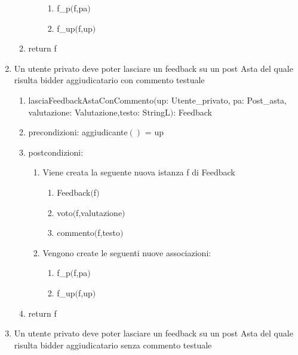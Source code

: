 \documentclass{article}
\begin{document}
\begin{enumerate}
\begin{enumerate}
\begin{enumerate}
            \begin{enumerate}
                \item f\_p$($f,pa$)$
                \item f\_up$($f,up$)$
            \end{enumerate}
        \end{enumerate}
        \item return f
    \end{enumerate}
    \newpage
    \item\label{sec:lasciaFeedbackAstaConCommento} Un utente privato deve poter lasciare un feedback su un post Asta del quale risulta bidder aggiudicatario con commento testuale
    \begin{enumerate}
        \item lasciaFeedbackAstaConCommento$($up: Utente\_privato, pa: Post\_asta, valutazione: Valutazione,\newline testo: StringL$)$: Feedback
        \item precondizioni: aggiudicante$()$ = up
        \item postcondizioni:
        \begin{enumerate}
            \item Viene creata la seguente nuova istanza f di Feedback
            \begin{enumerate}
                \item Feedback$($f$)$
                \item voto$($f,valutazione$)$
                \item commento$($f,testo$)$
            \end{enumerate}
            \item Vengono create le seguenti nuove associazioni:
            \begin{enumerate}
                \item f\_p$($f,pa$)$
                \item f\_up$($f,up$)$
            \end{enumerate}
        \end{enumerate}
        \item return f
    \end{enumerate}
    \newpage
    \item\label{sec:lasciaFeedbackAstaSenzaCommento} Un utente privato deve poter lasciare un feedback su un post Asta del quale risulta bidder aggiudicatario senza commento testuale
    \begin{enumerate}

\end{enumerate}
\end{enumerate}
\end{document}

